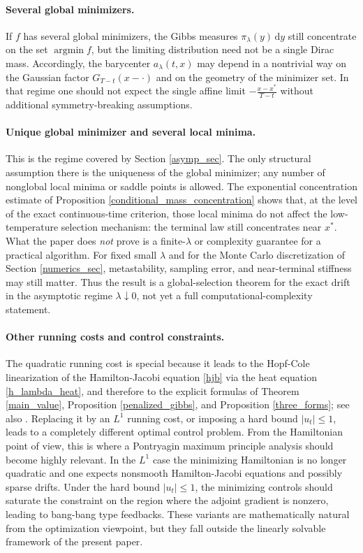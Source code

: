 \documentclass[11pt]{amsart}
\newcommand{\dd}{\,\mathrm{d}}
\renewcommand{\leq}{\leqslant}
\renewcommand{\Vert}{|}
\numberwithin{equation}{section}
\numberwithin{figure}{section}
\theoremstyle{definition}\newtheorem{remark}[theorem]{Remark}%
\begin{document}
\medskip
\paragraph{\bf Several global minimizers.}
If $f$ has several global minimizers, the Gibbs measures $\pi_\lambda(y)\dd y$ still concentrate on the set $\operatorname*{argmin} f$, but the limiting distribution need not be a single Dirac mass. Accordingly, the barycenter $a_\lambda(t,x)$ may depend in a nontrivial way on the Gaussian factor $G_{T-t}(x-\cdot)$ and on the geometry of the minimizer set. In that regime one should not expect the single affine limit $\displaystyle - \frac{x - x^*}{T-t}$ without additional symmetry-breaking assumptions.

\medskip
\paragraph{\bf Unique global minimizer and several local minima.}
This is the regime covered by Section \ref{asymp_sec}. The only structural assumption there is the uniqueness of the global minimizer; any number of nonglobal local minima or saddle points is allowed. The exponential concentration estimate of Proposition \ref{conditional_mass_concentration} shows that, at the level of the exact continuous-time criterion, those local minima do not affect the low-temperature selection mechanism: the terminal law still concentrates near $x^*$. What the paper does \emph{not} prove is a finite-$\lambda$ or complexity guarantee for a practical algorithm. For fixed small $\lambda$ and for the Monte Carlo discretization of Section \ref{numerics_sec}, metastability, sampling error, and near-terminal stiffness may still matter. Thus the result is a global-selection theorem for the exact drift in the asymptotic regime $\lambda \downarrow 0$, not yet a full computational-complexity statement.

\medskip
\paragraph{\bf Other running costs and control constraints.}
The quadratic running cost is special because it leads to the Hopf-Cole linearization of the Hamilton-Jacobi equation \eqref{hjb} via the heat equation \eqref{h_lambda_heat}, and therefore to the explicit formulas of Theorem \ref{main_value}, Proposition \ref{penalized_gibbs}, and Proposition \ref{three_forms}; see also \cite{Kappen05,Todorov06,Todorov09}. Replacing it by an $L^1$ running cost, or imposing a hard bound $\Vert u_t \Vert \leq 1$, leads to a completely different optimal control problem. From the Hamiltonian point of view, this is where a Pontryagin maximum principle analysis should become highly relevant. In the $L^1$ case the minimizing Hamiltonian is no longer quadratic and one expects nonsmooth Hamilton-Jacobi equations and possibly sparse drifts. Under the hard bound $\Vert u_t \Vert \leq 1$, the minimizing controls should saturate the constraint on the region where the adjoint gradient is nonzero, leading to bang-bang type feedbacks. These variants are mathematically natural from the optimization viewpoint, but they fall outside the linearly solvable framework of the present paper.
\end{document}
